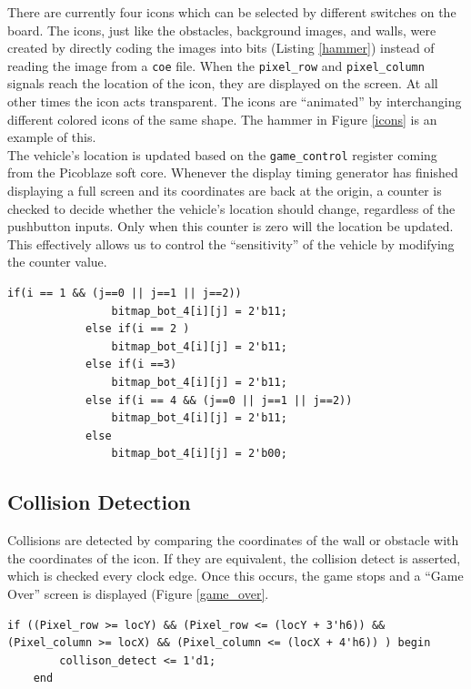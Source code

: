 \documentclass[11pt]{article}
\begin{document}
		There are currently four icons which can be selected by different switches on the board. The icons, just like the obstacles, background images, and walls, were created by directly coding the images into bits (Listing \ref{hammer}) instead of reading the image from a \texttt{coe} file. When the \texttt{pixel\_row} and \texttt{pixel\_column} signals reach the location of the icon, they are displayed on the screen. At all other times the icon acts transparent. The icons are ``animated'' by interchanging different colored icons of the same shape. The hammer in Figure \ref{icons} is an example of this.  \\
\hspace{12pt} The vehicle's location is updated based on the \texttt{game\_control} register coming from the Picoblaze soft core. Whenever the display timing generator has finished displaying a full screen and its coordinates are back at the origin, a counter is checked to decide whether the vehicle's location should change, regardless of the pushbutton inputs.  Only when this counter is zero will the location be updated.  This effectively allows us to control the ``sensitivity'' of the vehicle by modifying the counter value. 

\begin{lstlisting}[caption=Example Icon creation (hammer), label=hammer]		
			if(i == 1 && (j==0 || j==1 || j==2))
				bitmap_bot_4[i][j] = 2'b11;			
			else if(i == 2 )
				bitmap_bot_4[i][j] = 2'b11;	
			else if(i ==3)
				bitmap_bot_4[i][j] = 2'b11;			
			else if(i == 4 && (j==0 || j==1 || j==2))
				bitmap_bot_4[i][j] = 2'b11;						
			else
				bitmap_bot_4[i][j] = 2'b00;	
 \end{lstlisting}



\subsection{Collision Detection}	
		Collisions are detected by comparing the coordinates of the wall or obstacle with the coordinates of the icon.  If they are equivalent, the collision detect is asserted, which is checked every clock edge. Once this occurs, the game stops and a ``Game Over'' screen is displayed (Figure \ref{game_over}.  

\begin{lstlisting}[caption=Collision Detection Logic, label=collision]		
	if ((Pixel_row >= locY) && (Pixel_row <= (locY + 3'h6)) && (Pixel_column >= locX) && (Pixel_column <= (locX + 4'h6)) ) begin
		collison_detect <= 1'd1;
	end	
 \end{lstlisting}
 
\end{document}
